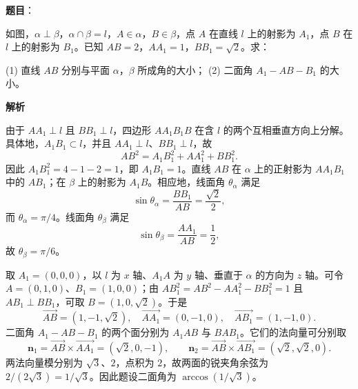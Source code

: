 \begin{answer}

\textbf{题目}：

如图，$\alpha\perp\beta\text{，}\alpha\cap\beta=l\text{，}A\in\alpha\text{，}B\in\beta$，点 \(A\) 在直线 \(l\) 上的射影为 \(A_1\)，点 \(B\) 在 \(l\) 上的射影为 \(B_1\)。已知 $AB=2\text{，}AA_1=1\text{，}BB_1=\sqrt2$。求：

(1) 直线 \(AB\) 分别与平面 $\alpha\text{，}\beta$ 所成角的大小；
(2) 二面角 \(A_1-AB-B_1\) 的大小。
\nopagebreak[4]
\begin{center}\end{center}
\nopagebreak[4]
\textbf{解析}


由于 $AA_1\perp l$ 且 $BB_1\perp l$，四边形 $AA_1B_1B$ 在含 $l$ 的两个互相垂直方向上分解。具体地，$A_1B_1\subset l$，并且 $AA_1\perp l$、$BB_1\perp l$，故
\nopagebreak[4]
\[
AB^2=A_1B_1^2+AA_1^2+BB_1^2.
\]
因此 $A_1B_1^2=4-1-2=1$，即 $A_1B_1=1$。直线 $AB$ 在 $\alpha$ 上的正射影为 $AA_1B_1$ 中的 $AB_1$；在 $\beta$ 上的射影为 $A_1B$。相应地，线面角 $\theta_\alpha$ 满足
\nopagebreak[4]
\[
\sin\theta_\alpha=\frac{BB_1}{AB}=\frac{\sqrt2}{2},
\]
而 $\theta_\alpha=\pi/4$。线面角 $\theta_\beta$ 满足
\nopagebreak[4]
\[
\sin\theta_\beta=\frac{AA_1}{AB}=\frac12,
\]
故 $\theta_\beta=\pi/6$。


取 $A_1=(0,0,0)$，以 $l$ 为 $x$ 轴、$A_1A$ 为 $y$ 轴、垂直于 $\alpha$ 的方向为 $z$ 轴。可令 $A=(0,1,0)$、$B_1=(1,0,0)$；由 $AB_1^2=AB^2-AA_1^2-BB_1^2=1$ 且 $AB_1\perp BB_1$，可取 $B=(1,0,\sqrt2)$。于是
\nopagebreak[4]
\[
\overrightarrow{AB}=(1,-1,\sqrt2),\quad
\overrightarrow{AA_1}=(0,-1,0),\quad
\overrightarrow{AB_1}=(1,-1,0).
\]
二面角 $A_1-AB-B_1$ 的两个面分别为 $A_1AB$ 与 $BAB_1$。它们的法向量可分别取
\nopagebreak[4]
\[
\mathbf n_1=\overrightarrow{AB}\times\overrightarrow{AA_1}=(\sqrt2,0,-1),\qquad
\mathbf n_2=\overrightarrow{AB}\times\overrightarrow{AB_1}=(\sqrt2,\sqrt2,0).
\]
两法向量模分别为 $\sqrt3$、$2$，点积为 $2$，故两面的锐夹角余弦为 $2/(2\sqrt3)=1/\sqrt3$。因此题设二面角为 $\arccos(1/\sqrt3)$。



\end{answer}
